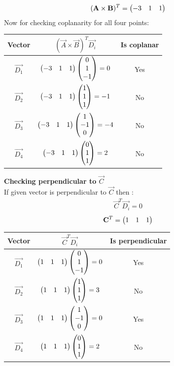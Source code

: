 \documentclass[12pt]{article}
\begin{document}
\begin{align}
    (\mathbf{A}\times\mathbf{B})^T=\begin{pmatrix}-3 & 1 &1 \end{pmatrix}
\end{align}
Now for checking coplanarity for all four points:
\begin{center}
\begin{tabular}{|c|c|c|}
\hline
Vector &  $(\vec{A}\times\vec{B})^T\vec{D_i}$ & Is coplanar\\ \hline
$\Vec{D_1}$ & $\begin{pmatrix}-3 & 1 &1 \end{pmatrix}\begin{pmatrix}0\\ 1\\-1\end{pmatrix}=0$ &Yes \\ \hline
$\Vec{D_2}$ & $\begin{pmatrix}-3 & 1 &1 \end{pmatrix}\begin{pmatrix}1\\ 1\\1\end{pmatrix}=-1$&No \\ \hline
$\Vec{D_3}$ & $\begin{pmatrix}-3 & 1 &1 \end{pmatrix}\begin{pmatrix}1\\ -1\\0\end{pmatrix}=-4$&No \\ \hline
$\Vec{D_4}$ & $\begin{pmatrix}-3 & 1 &1 \end{pmatrix}\begin{pmatrix}0\\ 1\\1\end{pmatrix}=2$&No\\ \hline

\end{tabular}
\end{center}
\newpage
\textbf{\large Checking perpendicular to $\vec{C}$ } \\

\vspace{1cm}
If given vector is perpendicular to $\vec{C}$ then :
\begin{align}
    {\vec{C}}^T\vec{D_i}=0
\end{align}
\begin{align}
    {\mathbf{C}}^T=\begin{pmatrix}1 &1&1\end{pmatrix}
\end{align}
\begin{center}
\begin{tabular}{|c|c|c|}
\hline
Vector & $ {\vec{C}}^T\vec{D_i}$& Is perpendicular\\ \hline
$\Vec{D_1}$ & $\begin{pmatrix}1 &1&1\end{pmatrix}\begin{pmatrix}0\\ 1\\-1\end{pmatrix}=0$&Yes\\ \hline
$\Vec{D_2}$ & $\begin{pmatrix}1 &1&1\end{pmatrix}\begin{pmatrix}1\\ 1\\1\end{pmatrix}=3$&No\\ \hline
$\Vec{D_3}$ & $\begin{pmatrix}1 &1&1\end{pmatrix}\begin{pmatrix}1\\ -1\\0\end{pmatrix}=0$& Yes\\ \hline
$\Vec{D_4}$ & $\begin{pmatrix}1 &1&1\end{pmatrix}\begin{pmatrix}0\\ 1\\1\end{pmatrix}=2$&No\\ \hline

\end{tabular}
\end{center}
\end{document}
